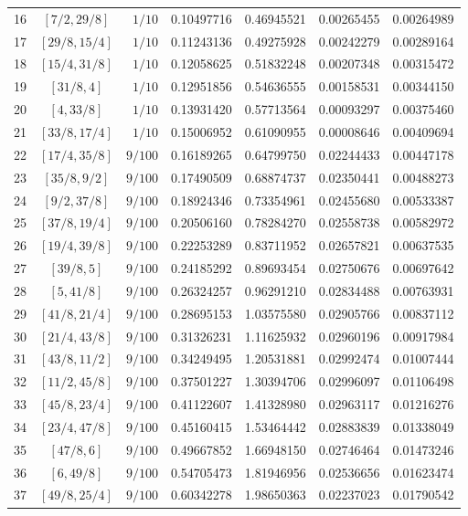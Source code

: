 \documentclass[reqno,english]{amsart}
\theoremstyle{definition}
\newtheorem{open problem}[theorem]{Open Problem}
\theoremstyle{remark}
\theoremstyle{plain}
\numberwithin{equation}{section}
\begin{document}
\begin{longtable}{@{}rcrrrrr@{}}
16 & $[7/2,29/8]$ & $1/10$ & 0.10497716 & 0.46945521 & 0.00265455 & 0.00264989 \\
17 & $[29/8,15/4]$ & $1/10$ & 0.11243136 & 0.49275928 & 0.00242279 & 0.00289164 \\
18 & $[15/4,31/8]$ & $1/10$ & 0.12058625 & 0.51832248 & 0.00207348 & 0.00315472 \\
19 & $[31/8,4]$ & $1/10$ & 0.12951856 & 0.54636555 & 0.00158531 & 0.00344150 \\
20 & $[4,33/8]$ & $1/10$ & 0.13931420 & 0.57713564 & 0.00093297 & 0.00375460 \\
21 & $[33/8,17/4]$ & $1/10$ & 0.15006952 & 0.61090955 & 0.00008646 & 0.00409694 \\
22 & $[17/4,35/8]$ & $9/100$ & 0.16189265 & 0.64799750 & 0.02244433 & 0.00447178 \\
23 & $[35/8,9/2]$ & $9/100$ & 0.17490509 & 0.68874737 & 0.02350441 & 0.00488273 \\
24 & $[9/2,37/8]$ & $9/100$ & 0.18924346 & 0.73354961 & 0.02455680 & 0.00533387 \\
25 & $[37/8,19/4]$ & $9/100$ & 0.20506160 & 0.78284270 & 0.02558738 & 0.00582972 \\
26 & $[19/4,39/8]$ & $9/100$ & 0.22253289 & 0.83711952 & 0.02657821 & 0.00637535 \\
27 & $[39/8,5]$ & $9/100$ & 0.24185292 & 0.89693454 & 0.02750676 & 0.00697642 \\
28 & $[5,41/8]$ & $9/100$ & 0.26324257 & 0.96291210 & 0.02834488 & 0.00763931 \\
29 & $[41/8,21/4]$ & $9/100$ & 0.28695153 & 1.03575580 & 0.02905766 & 0.00837112 \\
30 & $[21/4,43/8]$ & $9/100$ & 0.31326231 & 1.11625932 & 0.02960196 & 0.00917984 \\
31 & $[43/8,11/2]$ & $9/100$ & 0.34249495 & 1.20531881 & 0.02992474 & 0.01007444 \\
32 & $[11/2,45/8]$ & $9/100$ & 0.37501227 & 1.30394706 & 0.02996097 & 0.01106498 \\
33 & $[45/8,23/4]$ & $9/100$ & 0.41122607 & 1.41328980 & 0.02963117 & 0.01216276 \\
34 & $[23/4,47/8]$ & $9/100$ & 0.45160415 & 1.53464442 & 0.02883839 & 0.01338049 \\
35 & $[47/8,6]$ & $9/100$ & 0.49667852 & 1.66948150 & 0.02746464 & 0.01473246 \\
36 & $[6,49/8]$ & $9/100$ & 0.54705473 & 1.81946956 & 0.02536656 & 0.01623474 \\
37 & $[49/8,25/4]$ & $9/100$ & 0.60342278 & 1.98650363 & 0.02237023 & 0.01790542 \\

\end{longtable}
\end{document}
